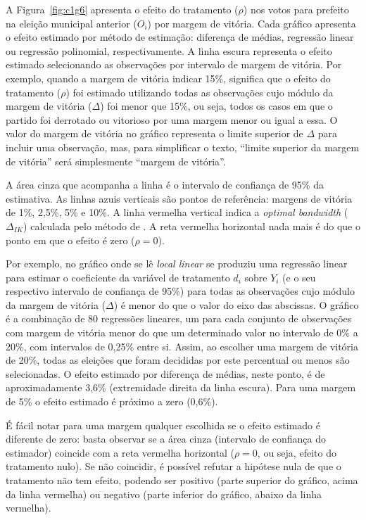 A Figura~\ref{fig:c1g6} apresenta o efeito do tratamento ($\rho$) nos votos para prefeito na eleição municipal anterior ($O_{i}$) por margem de vitória. Cada gráfico apresenta o efeito estimado por método de estimação: diferença de médias, regressão linear ou regressão polinomial, respectivamente. A linha escura representa o efeito estimado selecionando as observações por intervalo de margem de vitória. Por exemplo, quando a margem de vitória indicar 15\%, significa que o efeito do tratamento ($\rho$) foi estimado utilizando todas as observações cujo módulo da margem de vitória ($\Delta$) foi menor que 15\%, ou seja, todos os casos em que o partido foi derrotado ou vitorioso por uma margem menor ou igual a essa. O valor do margem de vitória no gráfico representa o limite superior de $\Delta$ para incluir uma observação, mas, para simplificar o texto, ``limite superior da margem de vitória'' será simplesmente ``margem de vitória''.

A área cinza que acompanha a linha é o intervalo de confiança de 95\% da estimativa. As linhas azuis verticais são pontos de referência: margens de vitória de 1\%, 2,5\%, 5\% e 10\%. A linha vermelha vertical indica a \textit{optimal bandwidth} ($\Delta_{IK}$) calculada pelo método de \citet{Imbens2011}. A reta vermelha horizontal nada mais é do que o ponto em que o efeito é zero ($\rho=0$).

Por exemplo, no gráfico onde se lê \textit{local linear} se produziu uma regressão linear para estimar o coeficiente da variável de tratamento $d_{i}$ sobre $Y_{i}$ (e o seu respectivo intervalo de confiança de 95\%) para todas as observações cujo módulo da margem de vitória ($\Delta$) é menor do que o valor do eixo das abscissas. O gráfico é a combinação de 80 regressões lineares, um para cada conjunto de observações com margem de vitória menor do que um determinado valor no intervalo de 0\% a 20\%, com intervalos de 0,25\% entre si. Assim, ao escolher uma margem de vitória de 20\%, todas as eleições que foram decididas por este percentual ou menos são selecionadas. O efeito estimado por diferença de médias, neste ponto, é de aproximadamente 3,6\% (extremidade direita da linha escura). Para uma margem de 5\% o efeito estimado é próximo a zero (0,6\%).

É fácil notar para uma margem qualquer escolhida se o efeito estimado é diferente de zero: basta observar se a área cinza (intervalo de confiança do estimador) coincide com a reta vermelha horizontal ($\rho=0$, ou seja, efeito do tratamento nulo). Se não coincidir, é possível refutar a hipótese nula de que o tratamento não tem efeito, podendo ser positivo (parte superior do gráfico, acima da linha vermelha) ou negativo (parte inferior do gráfico, abaixo da linha vermelha).

